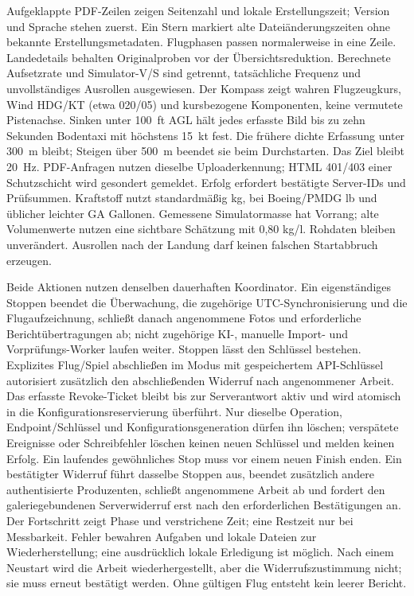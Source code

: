 \documentclass[11pt,a4paper]{article}
\begin{document}
Aufgeklappte PDF-Zeilen zeigen Seitenzahl und lokale Erstellungszeit; Version
und Sprache stehen zuerst. Ein Stern markiert alte Dateiänderungszeiten ohne
bekannte Erstellungsmetadaten. Flugphasen passen normalerweise in eine Zeile.
Landedetails behalten Originalproben vor der Übersichtsreduktion. Berechnete
Aufsetzrate und Simulator-V/S sind getrennt, tatsächliche Frequenz und
unvollständiges Ausrollen ausgewiesen. Der Kompass zeigt wahren Flugzeugkurs,
Wind HDG/KT (etwa 020/05) und kursbezogene Komponenten, keine vermutete
Pistenachse.
Sinken unter 100~ft AGL hält jedes erfasste Bild bis zu zehn Sekunden Bodentaxi
mit höchstens 15~kt fest. Die frühere dichte Erfassung unter 300~m bleibt;
Steigen über 500~m beendet sie beim Durchstarten. Das Ziel bleibt 20~Hz.
PDF-Anfragen nutzen dieselbe Uploaderkennung; HTML 401/403 einer Schutzschicht
wird gesondert gemeldet. Erfolg erfordert bestätigte Server-IDs und Prüfsummen.
Kraftstoff nutzt standardmäßig kg, bei Boeing/PMDG lb und üblicher leichter GA
Gallonen. Gemessene Simulatormasse hat Vorrang; alte Volumenwerte nutzen eine
sichtbare Schätzung mit 0,80 kg/l. Rohdaten bleiben unverändert. Ausrollen nach
der Landung darf keinen falschen Startabbruch erzeugen.

Beide Aktionen nutzen denselben dauerhaften Koordinator. Ein eigenständiges
Stoppen beendet die Überwachung, die zugehörige UTC-Synchronisierung und die
Flugaufzeichnung, schließt danach angenommene Fotos und erforderliche
Berichtübertragungen ab; nicht zugehörige KI-, manuelle Import- und
Vorprüfungs-Worker laufen weiter. Stoppen lässt den Schlüssel bestehen.
Explizites Flug/Spiel abschließen im Modus mit gespeichertem API-Schlüssel
autorisiert zusätzlich den abschließenden Widerruf nach angenommener Arbeit.
Das erfasste Revoke-Ticket bleibt bis zur Serverantwort aktiv und wird atomisch
in die Konfigurationsreservierung überführt. Nur dieselbe Operation,
Endpoint/Schlüssel und Konfigurationsgeneration dürfen ihn löschen; verspätete
Ereignisse oder Schreibfehler löschen keinen neuen Schlüssel und melden keinen
Erfolg. Ein laufendes gewöhnliches Stop muss vor einem neuen Finish enden.
Ein bestätigter Widerruf führt dasselbe Stoppen aus, beendet zusätzlich andere
authentisierte Produzenten, schließt angenommene Arbeit ab und fordert den
galeriegebundenen Serverwiderruf erst nach den erforderlichen Bestätigungen an.
Der Fortschritt zeigt Phase und verstrichene Zeit; eine Restzeit nur bei
Messbarkeit. Fehler bewahren Aufgaben und lokale Dateien zur Wiederherstellung;
eine ausdrücklich lokale Erledigung ist möglich. Nach einem Neustart wird die
Arbeit wiederhergestellt, aber die Widerrufszustimmung nicht; sie muss erneut
bestätigt werden. Ohne gültigen Flug entsteht kein leerer Bericht.
\end{document}
